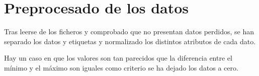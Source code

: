 
\section{Preprocesado de los datos}

Tras leerse de los ficheros y comprobado que no presentan datos perdidos, se han separado los datos y etiquetas y normalizado los distintos atributos de cada dato. 

Hay un caso en que los valores son tan parecidos que la diferencia entre el mínimo y el máximo son iguales como criterio se ha dejado los datos a cero.

